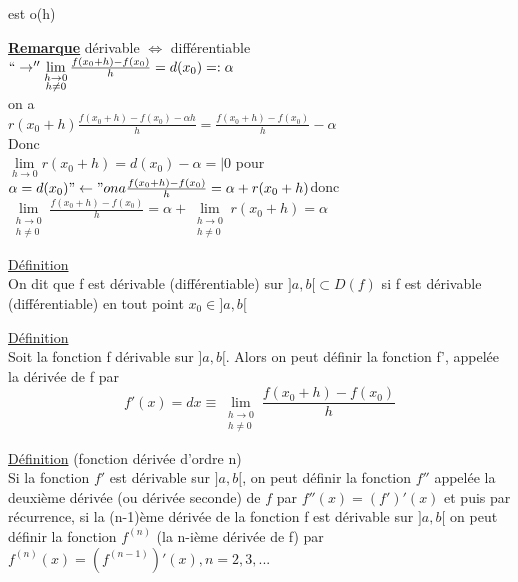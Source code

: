 \documentclass[12pt,a4paper]{article}
\newcommand{\limite}{\lim\limits_}
\newcommand{\evid}[1]{\textbf{\underline{#1}}}
\newcommand{\Definition}{\underline{Définition} }
\begin{document}
{\begin{boite}
 est o(h)
\end{boite}
\evid{Remarque} dérivable $\iff$ différentiable\\
$``\to'' \limite{\substack{h \to 0 \\ h \neq 0}} \frac{f(x_0 + h) - f(x_0)}{h} = d(x_0) =:\alpha$\\
on a\\
$r(x_0 + h)  \frac{f(x_0 + h) - f(x_0) - \alpha h}{h} = \frac{f(x_0 + h) - f(x_0)}{h} - \alpha$\\
Donc\\
$\limite{h \to 0} r(x_0 + h) = d(x_0) - \alpha =| 0$ pour $\alpha = d(x_0)\\
"\leftarrow" on a \frac{f(x_0 + h) - f(x_0)}{h} = \alpha + r(x_0+h)\\
$donc $\limite{\substack{h \to 0 \\ h \neq 0}} \frac{f(x_0 + h) - f(x_0)}{h} = \alpha + \limite{\substack{h \to 0 \\ h \neq 0}} r(x_0 + h) = \alpha$
\begin{boite}
\Definition \\
On dit que f est dérivable (différentiable) sur $]a,b[ \subset D(f)$ si f est dérivable (différentiable) en tout point $x_0 \in ]a,b[$
\end{boite}

\begin{boite}
\Definition \\
Soit la fonction f dérivable sur $]a,b[$. Alors on peut définir la fonction f', appelée la dérivée de f par 
\begin{equation}
f'(x) = dx \equiv \limite{\substack{h \to 0 \\ h \neq 0}} \frac{f(x_0 + h) - f(x_0)}{h}
\end{equation}
\end{boite}

\begin{boite}
\Definition (fonction dérivée d'ordre n)\\ 
Si la fonction $f'$ est dérivable sur $]a,b[$, on peut définir la fonction $f''$ appelée la deuxième dérivée (ou dérivée seconde) de $f$ par $f''(x) = (f')'(x)$ et puis par récurrence, si la (n-1)ème dérivée de la fonction f est dérivable sur $]a,b[$ on peut définir la fonction $f^{(n)}$ (la n-ième dérivée de f) par $f^{(n)}(x) = (f^{(n-1)})'(x), n = 2,3,... $
\end{boite}
}
\end{document}
